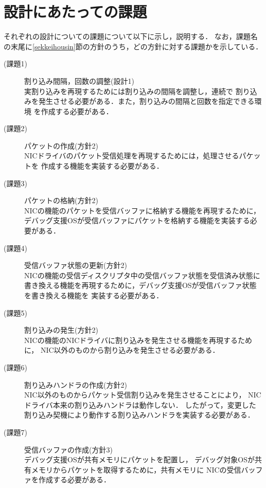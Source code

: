 \documentclass[tanilab-enum]{graduate}
\begin{document}
\section{設計にあたっての課題}\label{kadai}
それぞれの設計についての課題について以下に示し，説明する．
なお，課題名の末尾に\ref{sekkeihousin}節の方針のうち，どの方針に対する課題かを示している．
\begin{description}
    \item[(課題1)]割り込み間隔，回数の調整(設計1)\\
        実割り込みを再現するためには割り込みの間隔を調整し，連続で
        割り込みを発生させる必要がある．また，割り込みの間隔と回数を指定できる環境
        を作成する必要がある．
    \item[(課題2)]パケットの作成(方針2)\\
        NICドライバのパケット受信処理を再現するためには，処理させるパケットを
        作成する機能を実装する必要がある．
    \item[(課題3)]パケットの格納(方針2)\\
        NICの機能のパケットを受信バッファに格納する機能を再現するために，
        デバッグ支援OSが受信バッファにパケットを格納する機能を実装する必要がある．
    \item[(課題4)]受信バッファ状態の更新(方針2)\\
        NICの機能の受信ディスクリプタ中の受信バッファ状態を受信済み状態に
        書き換える機能を再現するために，デバッグ支援OSが受信バッファ状態を書き換える機能を
        実装する必要がある．
    \item[(課題5)]割り込みの発生(方針2)\\
        NICの機能のNICドライバに割り込みを発生させる機能を再現するために，
        NIC以外のものから割り込みを発生させる必要がある．
    \item[(課題6)]割り込みハンドラの作成(方針2)\\
        NIC以外のものからパケット受信割り込みを発生させることにより，
        NICドライバ本来の割り込みハンドラは動作しない．
        したがって，変更した割り込み契機により動作する割り込みハンドラを実装する必要がある．
    \item[(課題7)]受信バッファの作成(方針3)\\
        デバッグ支援OSが共有メモリにパケットを配置し，
        デバッグ対象OSが共有メモリからパケットを取得するために，共有メモリに
        NICの受信バッファを作成する必要がある．
\end{description}
\end{document}
